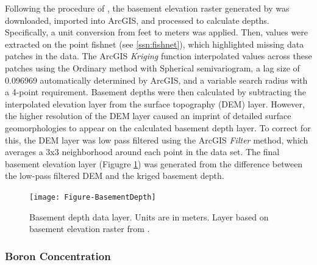 Following the procedure of \citet{pepin_new_2018}, the basement elevation raster generated by \citet{bielicki_hydrogeolgic_2015} was downloaded, imported into ArcGIS, and processed to calculate depths. Specifically, a unit conversion from feet to meters was applied. Then, values were extracted on the point fishnet (see \ref{ssn:fishnet}), which highlighted missing data patches in the data. The ArcGIS \textit{Kriging} function interpolated values across these patches using the Ordinary method with Spherical semivariogram, a lag size of 0.096969 automatically determined by ArcGIS, and a variable search radius with a 4-point requirement. Basement depths were then calculated by subtracting the interpolated elevation layer from the surface topography (DEM) layer. However, the higher resolution of the DEM layer caused an imprint of detailed surface geomorphologies to appear on the calculated basement depth layer. To correct for this, the DEM layer was low pass filtered using the ArcGIS \textit{Filter} method, which averages a 3x3 neighborhood around each point in the data set. The final basement elevation layer (Figugre \ref{fig:feat_basementdepth}) was generated from the difference between the low-pass filtered DEM and the kriged basement depth.

\begin{figure}[h!]
\centering
\texttt{[image: Figure-BasementDepth]}
\caption[Basement depth data layer]{Basement depth data layer. Units are in meters. Layer based on basement elevation raster from \protect\citep{bielicki_hydrogeolgic_2015}.}
\label{fig:feat_basementdepth}
\end{figure}

\subsubsection{Boron Concentration}

